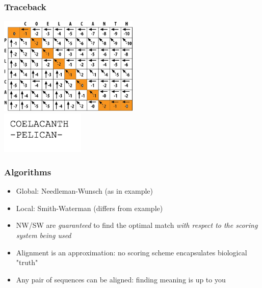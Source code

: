 \documentclass[table]{beamer}
\begin{document}
    \begin{frame}
     \frametitle{Traceback}
       \begin{center}
         \includegraphics[width=0.5\textwidth]{images/traceback} \\
         \includegraphics[width=0.3\textwidth]{images/traceback_sequence}         
       \end{center}
    \end{frame}     

    \begin{frame}
     \frametitle{Algorithms}
       \begin{itemize}
         \item<1-> Global: Needleman-Wunsch (as in example)
         \item<1-> Local: Smith-Waterman (differs from example)
         \item<2-> NW/SW are \emph{guaranteed} to find the optimal match \emph{with respect to the scoring system being used}
         \item<2-> Alignment is an approximation: no scoring scheme encapsulates biological "truth"
         \item<2-> Any pair of sequences can be aligned: finding meaning is up to you
       \end{itemize}
    \end{frame}   

   
\end{document}
